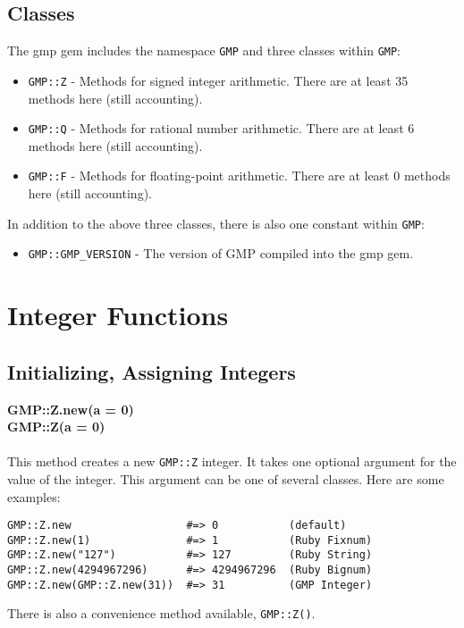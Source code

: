 \documentclass[pdftex,10pt]{article}
\begin{document}
\subsection{Classes}
The gmp gem includes the namespace \texttt{GMP} and three classes within \texttt{GMP}:
\begin{itemize}
  \item \texttt{GMP::Z} - Methods for signed integer arithmetic. There are at least 35
    methods here (still accounting).
  \item \texttt{GMP::Q} - Methods for rational number arithmetic. There are at least 6
    methods here (still accounting).
  \item \texttt{GMP::F} - Methods for floating-point arithmetic. There are at least 0
    methods here (still accounting).
\end{itemize}

In addition to the above three classes, there is also one constant within \texttt{GMP}:
\begin{itemize}
  \item \texttt{GMP::GMP\_VERSION} - The version of GMP compiled into the gmp gem.
\end{itemize}

\section{Integer Functions}

\subsection{Initializing, Assigning Integers}

\large{\textbf{GMP::Z.new(a = 0)}}\\
\large{\textbf{GMP::Z(a = 0)}}\\
\\
This method creates a new \texttt{GMP::Z} integer. It takes one optional argument for the value of the integer. This argument can be one of several classes. Here are some examples:
\begin{verbatim}
GMP::Z.new                  #=> 0           (default)
GMP::Z.new(1)               #=> 1           (Ruby Fixnum)
GMP::Z.new("127")           #=> 127         (Ruby String)
GMP::Z.new(4294967296)      #=> 4294967296  (Ruby Bignum)
GMP::Z.new(GMP::Z.new(31))  #=> 31          (GMP Integer)
\end{verbatim}

There is also a convenience method available, \texttt{GMP::Z()}.\\
\end{document}
